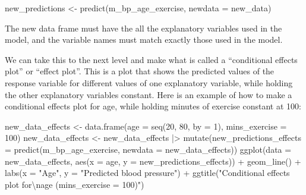 \documentclass[
  letterpaper,
  8pt,
  a4paper]{book}
\newenvironment{Shaded}{\begin{snugshade}}{\end{snugshade}}
\newcommand{\AttributeTok}[1]{\textcolor[rgb]{0.40,0.45,0.13}{#1}}
\newcommand{\DecValTok}[1]{\textcolor[rgb]{0.68,0.00,0.00}{#1}}
\newcommand{\FunctionTok}[1]{\textcolor[rgb]{0.28,0.35,0.67}{#1}}
\newcommand{\NormalTok}[1]{\textcolor[rgb]{0.00,0.23,0.31}{#1}}
\newcommand{\OtherTok}[1]{\textcolor[rgb]{0.00,0.23,0.31}{#1}}
\newcommand{\SpecialCharTok}[1]{\textcolor[rgb]{0.37,0.37,0.37}{#1}}
\newcommand{\StringTok}[1]{\textcolor[rgb]{0.13,0.47,0.30}{#1}}
\begin{document}
\begin{Shaded}
\begin{Highlighting}[]
\NormalTok{new\_predictions }\OtherTok{\textless{}{-}} \FunctionTok{predict}\NormalTok{(m\_bp\_age\_exercise, }\AttributeTok{newdata =}\NormalTok{ new\_data)}
\end{Highlighting}
\end{Shaded}

\begin{tcolorbox}[enhanced jigsaw, arc=.35mm, bottomrule=.15mm, bottomtitle=1mm, breakable, colback=white, colbacktitle=quarto-callout-important-color!10!white, colframe=quarto-callout-important-color-frame, coltitle=black, left=2mm, leftrule=.75mm, opacityback=0, opacitybacktitle=0.6, rightrule=.15mm, title=\textcolor{quarto-callout-important-color}{\faExclamation}\hspace{0.5em}{Important}, titlerule=0mm, toprule=.15mm, toptitle=1mm]

The new data frame must have the all the explanatory variables used in
the model, and the variable names must match exactly those used in the
model.

\end{tcolorbox}

We can take this to the next level and make what is called a
``conditional effects plot'' or ``effect plot''. This is a plot that
shows the predicted values of the response variable for different values
of one explanatory variable, while holding the other explanatory
variables constant. Here is an example of how to make a conditional
effects plot for age, while holding minutes of exercise constant at 100:

\begin{Shaded}
\begin{Highlighting}[]
\NormalTok{new\_data\_effects }\OtherTok{\textless{}{-}} \FunctionTok{data.frame}\NormalTok{(}\AttributeTok{age =} \FunctionTok{seq}\NormalTok{(}\DecValTok{20}\NormalTok{, }\DecValTok{80}\NormalTok{, }\AttributeTok{by =} \DecValTok{1}\NormalTok{),}
                                \AttributeTok{mins\_exercise =} \DecValTok{100}\NormalTok{)}
\NormalTok{new\_data\_effects }\OtherTok{\textless{}{-}}\NormalTok{ new\_data\_effects }\SpecialCharTok{|\textgreater{}}
  \FunctionTok{mutate}\NormalTok{(}\AttributeTok{new\_predictions\_effects =} \FunctionTok{predict}\NormalTok{(m\_bp\_age\_exercise, }\AttributeTok{newdata =}\NormalTok{ new\_data\_effects))}
\FunctionTok{ggplot}\NormalTok{(}\AttributeTok{data =}\NormalTok{ new\_data\_effects, }\FunctionTok{aes}\NormalTok{(}\AttributeTok{x =}\NormalTok{ age, }\AttributeTok{y =}\NormalTok{ new\_predictions\_effects)) }\SpecialCharTok{+}
  \FunctionTok{geom\_line}\NormalTok{() }\SpecialCharTok{+}
  \FunctionTok{labs}\NormalTok{(}\AttributeTok{x =} \StringTok{"Age"}\NormalTok{, }\AttributeTok{y =} \StringTok{"Predicted blood pressure"}\NormalTok{) }\SpecialCharTok{+}
  \FunctionTok{ggtitle}\NormalTok{(}\StringTok{"Conditional effects plot for}\SpecialCharTok{\textbackslash{}n}\StringTok{age (mins\_exercise = 100)"}\NormalTok{)}
\end{Highlighting}
\end{Shaded}
\end{document}
